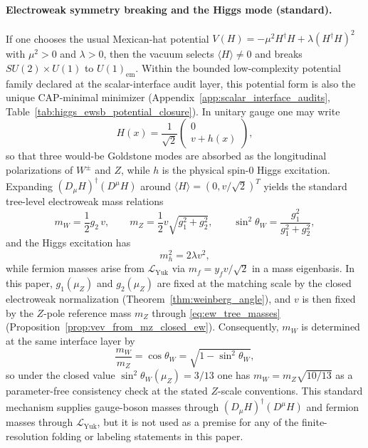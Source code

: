 \paragraph{Electroweak symmetry breaking and the Higgs mode (standard).}
If one chooses the usual Mexican-hat potential $V(H)=-\mu^2 H^\dagger H+\lambda (H^\dagger H)^2$ with $\mu^2>0$ and $\lambda>0$, then the vacuum selects $\langle H\rangle\neq 0$ and breaks $SU(2)\times U(1)$ to $U(1)_{\mathrm{em}}$.
Within the bounded low-complexity potential family declared at the scalar-interface audit layer, this potential form is also the unique CAP-minimal minimizer (Appendix~\ref{app:scalar_interface_audits}, Table~\ref{tab:higgs_ewsb_potential_closure}).
In unitary gauge one may write
\[
H(x)=\frac{1}{\sqrt{2}}\begin{pmatrix}0\\ v+h(x)\end{pmatrix},
\]
so that three would-be Goldstone modes are absorbed as the longitudinal polarizations of $W^\pm$ and $Z$, while $h$ is the physical spin-$0$ Higgs excitation.
Expanding $(D_\mu H)^\dagger(D^\mu H)$ around $\langle H\rangle=(0,v/\sqrt{2})^T$ yields the standard tree-level electroweak mass relations
\begin{equation}\label{eq:ew_tree_masses}
m_W=\frac{1}{2}g_2\,v,\qquad
m_Z=\frac{1}{2}v\sqrt{g_1^2+g_2^2},\qquad
\sin^2\theta_W=\frac{g_1^2}{g_1^2+g_2^2},
\end{equation}
and the Higgs excitation has
\begin{equation}\label{eq:higgs_mass_lambda}
m_h^2=2\lambda v^2,
\end{equation}
while fermion masses arise from $\mathcal{L}_{\mathrm{Yuk}}$ via $m_f=y_f v/\sqrt{2}$ in a mass eigenbasis.
\InterfaceTag In this paper, $g_1(\mu_Z)$ and $g_2(\mu_Z)$ are fixed at the matching scale by the closed electroweak normalization (Theorem~\ref{thm:weinberg_angle}), and $v$ is then fixed by the $Z$-pole reference mass $m_Z$ through \eqref{eq:ew_tree_masses} (Proposition~\ref{prop:vev_from_mz_closed_ew}).
Consequently, $m_W$ is determined at the same interface layer by
\begin{equation}\label{eq:mw_from_mz_thetaW}
\frac{m_W}{m_Z}=\cos\theta_W=\sqrt{1-\sin^2\theta_W},
\end{equation}
so under the closed value $\sin^2\theta_W(\mu_Z)=3/13$ one has $m_W=m_Z\sqrt{10/13}$ as a parameter-free consistency check at the stated $Z$-scale conventions.
This standard mechanism supplies gauge-boson masses through $(D_\mu H)^\dagger(D^\mu H)$ and fermion masses through $\mathcal{L}_{\mathrm{Yuk}}$, but it is not used as a premise for any of the finite-resolution folding or labeling statements in this paper.

